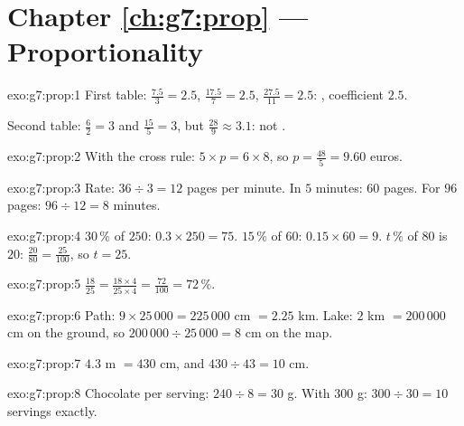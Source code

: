 \section*{Chapter \ref{ch:g7:prop} --- Proportionality}

\begin{solution}{exo:g7:prop:1}
First table:  $\frac{7.5}{3} = 2.5$,
$\frac{17.5}{7} = 2.5$, $\frac{27.5}{11} = 2.5$: ,
coefficient $2.5$.

Second table: $\frac62 = 3$ and $\frac{15}{5} = 3$, but
$\frac{28}{9} \approx 3.1$: not .
\end{solution}

\begin{solution}{exo:g7:prop:2}
With the cross rule: $5 \times p = 6 \times 8$, so
$p = \frac{48}{5} = 9.60$ euros.
\end{solution}

\begin{solution}{exo:g7:prop:3}
Rate: $36 \div 3 = 12$ pages per minute. In $5$ minutes:
$60$ pages. For $96$ pages: $96 \div 12 = 8$ minutes.
\end{solution}

\begin{solution}{exo:g7:prop:4}
$30\,\%$ of $250$: $0.3 \times 250 = 75$. \quad
$15\,\%$ of $60$: $0.15 \times 60 = 9$. \quad
$t\,\%$ of $80$ is $20$: $\frac{20}{80} = \frac{25}{100}$, so
$t = 25$.
\end{solution}

\begin{solution}{exo:g7:prop:5}
$\frac{18}{25} = \frac{18 \times 4}{25 \times 4} = \frac{72}{100} =
72\,\%$.
\end{solution}

\begin{solution}{exo:g7:prop:6}
Path: $9 \times 25\,000 = 225\,000$ cm $= 2.25$ km.
Lake: $2$ km $= 200\,000$ cm on the ground, so
$200\,000 \div 25\,000 = 8$ cm on the map.
\end{solution}

\begin{solution}{exo:g7:prop:7}
$4.3$ m $= 430$ cm, and $430 \div 43 = 10$ cm.
\end{solution}

\begin{solution}{exo:g7:prop:8}
Chocolate per serving: $240 \div 8 = 30$ g. With $300$ g:
$300 \div 30 = 10$ servings exactly.
\end{solution}

